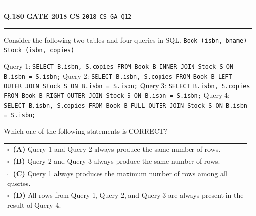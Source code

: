 \documentclass[a4paper,10pt]{article}
\begin{document}
\vspace{6pt}\hrule height 0.35pt\vspace{6pt}
\noindent
\begin{tcolorbox}[
    blanker,
    sidebyside,
    sidebyside align=top,
    lefthand width=0.55\textwidth,
    top=4pt, bottom=4pt, left=0pt, right=0pt,
    middle=16pt,
    underlay={
        \draw[dashed, black!80, line width=0.8pt, dash pattern=on 4pt off 3pt]
            ([xshift=0.55\textwidth+8pt]frame.north west) --
            ([xshift=0.55\textwidth+8pt]frame.south west);
    }
]
\textbf{Q.180}  \hfill {\footnotesize\textbf{GATE 2018 CS} \quad \tiny\texttt{2018\_CS\_GA\_Q12}}
\vspace{2pt}\hrule height 0.3pt\vspace{4pt}

Consider the following two tables and four queries in SQL.
\texttt{Book (isbn, bname)}
\texttt{Stock (isbn, copies)}
\par\medskip
Query 1: \texttt{SELECT B.isbn, S.copies FROM Book B INNER JOIN Stock S ON B.isbn = S.isbn;}
Query 2: \texttt{SELECT B.isbn, S.copies FROM Book B LEFT OUTER JOIN Stock S ON B.isbn = S.isbn;}
Query 3: \texttt{SELECT B.isbn, S.copies FROM Book B RIGHT OUTER JOIN Stock S ON B.isbn = S.isbn;}
Query 4: \texttt{SELECT B.isbn, S.copies FROM Book B FULL OUTER JOIN Stock S ON B.isbn = S.isbn;}
\par\medskip
Which one of the following statements is CORRECT?

\par\vspace{6pt}\noindent
\begin{tabular}{@{}p{0.98\linewidth}@{}}
$\square$\ \textbf{(A)} Query 1 and Query 2 always produce the same number of rows. \\
\addlinespace[3pt]
$\square$\ \textbf{(B)} Query 2 and Query 3 always produce the same number of rows. \\
\addlinespace[3pt]
$\square$\ \textbf{(C)} Query 1 always produces the maximum number of rows among all queries. \\
\addlinespace[3pt]
$\square$\ \textbf{(D)} All rows from Query 1, Query 2, and Query 3 are always present in the result of Query 4.
\end{tabular}

\tcblower


\end{tcolorbox}
\end{document}
